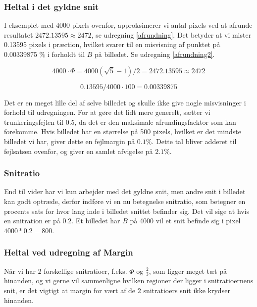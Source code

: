 \subsubsection{Heltal i det gyldne snit}

I eksemplet med 4000 pixels ovenfor, approksimerer vi antal pixels ved
at afrunde resultatet $2472.13595 \approx 2472$, se udregning
\ref{afrundning}. Det betyder at vi mister 0.13595 pixels i præction,
hvilket svarer til en misvisning af punktet på 0.00339875 $\%$ i forholdt
til $B$ på billedet. Se udregning \ref{afrundning2}.

\begin{equation}
	4000 \cdot \varPhi = 4000(\sqrt{5}-1)/2 = 2472.13595 \approx 2472 \label{afrundning}
\end{equation}

\begin{equation}
	0.13595/4000 \cdot 100 = 0.00339875 \label{afrundning2}
\end{equation}

Det er en meget lille del af selve billedet og skulle ikke give nogle
misvisninger i forhold til udregningen. For at gøre det lidt mere
generelt, sætter vi trunkeringsfejlen til $0.5$, da det er den maksimale
afrundingsfacktor som kan forekomme. Hvis billedet har en størrelse på
500 pixels, hvilket er det mindste billedet vi har, giver dette en fejlmargin
på $0.1 \%$. Dette tal bliver adderet til fejlsatsen ovenfor, og giver
en samlet afvigelse på $2.1\%$.

\subsubsection{Snitratio}
End til vider har vi kun arbejder med det gyldne snit, men andre snit i
billedet kan godt optræde, derfor indføre vi en nu betegnelse
snitratio, som betegner en procents sats for hvor lang inde i billedet
snittet befinder sig. Det vil sige at hvis en snitration er på $0.2$. Et
billedet har $B$ på 4000 vil et snit befinde sig i pixel $4000*0.2 =
800$.

\subsubsection{Heltal ved udregning af Margin}
Når vi har 2 forskellige snitratioer, f.eks. $\varPhi$ og $\frac{2}{3}$,
som ligger meget tæt på hinanden, og vi gerne vil sammenligne hvilken
regioner der ligger i snitratioernens snit, er det vigtigt at margin for
vært af de 2 snitratioers snit ikke krydser hinanden. 

